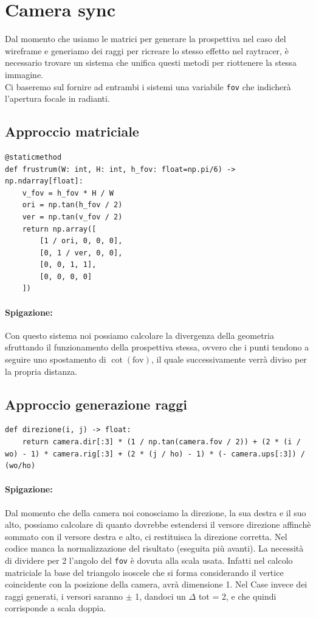 \documentclass{article}
\begin{document}
\newpage

\section{Camera sync}
Dal momento che usiamo le matrici per generare la prospettiva nel caso del wireframe e generiamo dei raggi per ricreare lo stesso effetto nel raytracer, è necessario trovare un sistema che unifica questi metodi per riottenere la stessa immagine.
\\
Ci baseremo sul fornire ad entrambi i sistemi una variabile \texttt{fov} che indicherà l'apertura focale in radianti.
\subsection{Approccio matriciale}
\begin{lstlisting}[style=Pythonstyle, caption={Matrici di applicazione prospettiva}]
@staticmethod
def frustrum(W: int, H: int, h_fov: float=np.pi/6) -> np.ndarray[float]:
	v_fov = h_fov * H / W
	ori = np.tan(h_fov / 2)
	ver = np.tan(v_fov / 2)
	return np.array([
		[1 / ori, 0, 0, 0],
		[0, 1 / ver, 0, 0],
		[0, 0, 1, 1],
		[0, 0, 0, 0]
	])
\end{lstlisting}
%
\paragraph{Spigazione:}
Con questo sistema noi possiamo calcolare la divergenza della geometria sfruttando il funzionamento della prospettiva stessa, ovvero che i punti tendono a seguire uno spostamento di $\cot(\text{fov})$, il quale successivamente verrà diviso per la propria distanza.

\subsection{Approccio generazione raggi}

\begin{lstlisting}[style=Pythonstyle, caption={Calcolo della direzione del raggio generato in base al fov}]
def direzione(i, j) -> float:
	return camera.dir[:3] * (1 / np.tan(camera.fov / 2)) + (2 * (i / wo) - 1) * camera.rig[:3] + (2 * (j / ho) - 1) * (- camera.ups[:3]) / (wo/ho)
\end{lstlisting}
%
\paragraph{Spigazione:}
Dal momento che della camera noi conosciamo la direzione, la sua destra e il suo alto, possiamo calcolare di quanto dovrebbe estendersi il versore direzione affinchè sommato con il versore destra e alto, ci restituisca la direzione corretta. Nel codice manca la normalizzazione del risultato (eseguita più avanti). 
La necessità di dividere per 2 l'angolo del \texttt{fov} è dovuta alla scala usata. Infatti nel calcolo matriciale la base del triangolo isoscele che si forma considerando il vertice coincidente con la posizione della camera, avrà dimensione 1. Nel Case invece dei raggi generati, i versori saranno $\pm$ 1, dandoci un $\Delta$ tot = 2, e che quindi corrisponde a scala doppia.
\end{document}
